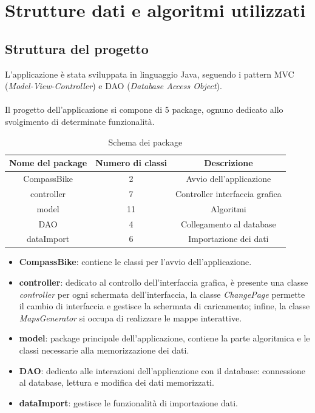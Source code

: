 \documentclass[a4paper, 12pt]{article}
\begin{document}
\newpage


\section{Strutture dati e algoritmi utilizzati}

	\subsection{Struttura del progetto}
	
	L'applicazione è stata sviluppata in linguaggio Java, seguendo i pattern MVC (\textit{Model-View-Controller}) e DAO (\textit{Database Access Object}).\\\\
	Il progetto dell'applicazione si compone di 5 package, ognuno dedicato allo svolgimento di determinate funzionalità.\\

	\begin{table}
	\begin{center}
	\caption{Schema dei package}
	 \begin{tabular}{| c | c |  c |} 
	 \hline
	 \textbf{Nome del package} & \textbf{Numero di classi} & \textbf{Descrizione} \\ [0.5ex] 
	\hline
	 \hline
	 CompassBike & 2 & Avvio dell'applicazione \\
	 \hline
	 controller & 7 & Controller interfaccia grafica \\  
	 \hline
	 model & 11 & Algoritmi \\
	 \hline
	 DAO & 4 & Collegamento al database \\
	 \hline
	 dataImport & 6 & Importazione dei dati \\
	 \hline
	\end{tabular}
	\end{center}
	\end{table}

	\begin{itemize}
		\item \textbf{CompassBike}: contiene le classi per l'avvio dell'applicazione.
		\item \textbf{controller}:  dedicato al controllo dell'interfaccia grafica, è presente una classe \textit{controller} per ogni schermata dell'interfaccia, la classe \textit{ChangePage} permette il cambio di interfaccia e gestisce la schermata di caricamento; infine, la classe \textit{MapsGenerator} si occupa di realizzare le mappe interattive.
		\item \textbf{model}:  package principale dell'applicazione, contiene la parte algoritmica e le classi necessarie alla memorizzazione dei dati.
		\item \textbf{DAO}: dedicato alle interazioni dell'applicazione con il database: connessione al database, lettura e modifica dei dati memorizzati.
		\item \textbf{dataImport}: gestisce le funzionalità di importazione dati.
	\end{itemize}
\end{document}
